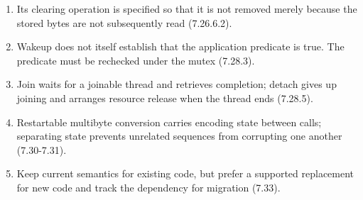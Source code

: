 \documentclass[10pt,letterpaper]{article}
\begin{document}
\begin{enumerate}
  \item Its clearing operation is specified so that it is not removed merely because the stored bytes are not subsequently read (7.26.6.2).

  \item Wakeup does not itself establish that the application predicate is true. The predicate must be rechecked under the mutex (7.28.3).

  \item Join waits for a joinable thread and retrieves completion; detach gives up joining and arranges resource release when the thread ends (7.28.5).

  \item Restartable multibyte conversion carries encoding state between calls; separating state prevents unrelated sequences from corrupting one another (7.30-7.31).

  \item Keep current semantics for existing code, but prefer a supported replacement for new code and track the dependency for migration (7.33).
\end{enumerate}
\end{document}
